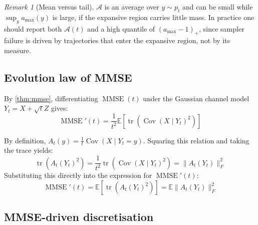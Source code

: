 \documentclass{article}
\newcommand{\amb}{\mathcal{A}}
\theoremstyle{plain}
\theoremstyle{definition}
\theoremstyle{remark}
\newtheorem{remark}[theorem]{Remark}
\begin{document}
\begin{remark}[Mean versus tail]
$\amb$ is an average over $y\sim p_t$ and can be small while
$\sup_y a_{\max}(y)$ is large, if the expansive region carries little
mass. In practice one should report
both $\amb(t)$ and a high quantile of $(a_{\max}-1)_+$, since sampler
failure is driven by trajectories that enter the expansive region, not by
its measure.
\end{remark}

\subsection{Evolution law of MMSE}


By \autoref{thm:mmse}, differentiating $\operatorname{MMSE}(t)$ under the Gaussian channel model $Y_t = X + \sqrt{t}Z$ gives:
\begin{equation}
\operatorname{MMSE}'(t) = \frac{1}{t^2} \mathbb{E}\left[\operatorname{tr}\left(\operatorname{Cov}\left(X \mid Y_t\right)^2\right)\right]
\end{equation}

By definition, $A_t(y) = \frac{1}{t} \operatorname{Cov}\left(X \mid Y_t=y\right)$. Squaring this relation and taking the trace yields:
\begin{equation}
\operatorname{tr}\left(A_t(Y_t)^2\right) = \frac{1}{t^2} \operatorname{tr}\left(\operatorname{Cov}\left(X \mid Y_t\right)^2\right) = \|A_t(Y_t)\|_F^2
\end{equation}
Substituting this directly into the expression for $\operatorname{MMSE}'(t)$:
\begin{equation}
    \label{eq:mmse-prime-A}
\operatorname{MMSE}'(t) = \mathbb{E}\left[\operatorname{tr}\left(A_t(Y_t)^2\right)\right] = \mathbb{E}\|A_t(Y_t)\|_F^2
\end{equation}




\subsection{MMSE-driven discretisation}
\end{document}
